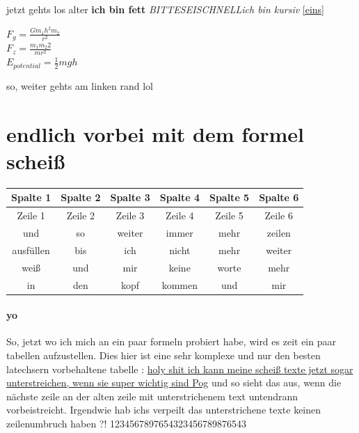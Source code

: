 \documentclass[a4paper]{scrartcl}
\begin{document}
				jetzt gehts los alter \textbf{ich bin fett}
				\emph{BITTESEISCHNELL}\textit{ich bin kursiv}
				\ref{eins}
				\linebreak[3]
				\\ \begin{center} \huge ${F}_{g}=\frac{G{m}_{1}h^2{m}_{2}}{{r}^{2}}$
				\linebreak[5]
				\\ {\color{red}${F}_{z}=\frac{{m}_{1}{m}_{2}{2}}{{}{m r}^{2}}$}
				\linebreak[5]
				\\$E_{potential}=\frac{{1}}{2}mgh$
				\linebreak[10]
				
				\end{center}
			
			so, weiter gehts am linken rand lol
		
		\section{endlich vorbei mit dem formel scheiß}
		\begin{tabular}{||c||c||c||c||c||c|}
	
			\hline 
			Spalte 1  & Spalte 2 & Spalte 3 & Spalte 4 & Spalte 5 & Spalte 6 \\ 
			\hline 
			Zeile 1  & Zeile 2  & Zeile 3  & Zeile 4 & Zeile 5 & Zeile 6 \\ 
			\hline 
			und  & so  & weiter  & immer  & mehr  & zeilen  \\ 
			\hline 
			ausfüllen & bis  & ich  & nicht  & mehr  & weiter \\ 
			\hline 
			weiß  & und  & mir  & keine  & worte  & mehr \\ 
			\hline 
			in  & den & kopf  & kommen  & und  & mir \\ 
			\hline
		\end{tabular} 
		
		\paragraph{yo}
		So, jetzt wo ich mich an ein paar formeln probiert habe, wird es zeit ein paar tabellen aufzustellen. Dies hier ist eine sehr komplexe und nur den besten latechsern vorbehaltene tabelle :
		\underline{holy shit ich kann meine scheiß texte jetzt sogar unterstreichen, wenn sie super wichtig sind Pog} und so sieht das aus, wenn die nächste zeile an der alten zeile mit
		 unterstrichenem text untendrann vorbeistreicht. Irgendwie hab ichs verpeilt das unterstrichene texte keinen zeilenumbruch haben ?!  1234567897654323456789876543 
\end{document}
